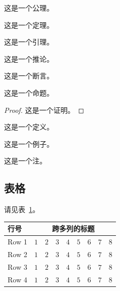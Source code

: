 \begin{axiom}
   这是一个公理。 
\end{axiom}
\begin{theorem}
   这是一个定理。 
\end{theorem}
\begin{lemma}
   这是一个引理。 
\end{lemma}
\begin{corollary}
   这是一个推论。 
\end{corollary}
\begin{assertion}
   这是一个断言。 
\end{assertion}
\begin{proposition}
   这是一个命题。 
\end{proposition}
\begin{proof}
    这是一个证明。
\end{proof}
\begin{definition}
    这是一个定义。
\end{definition}
\begin{example}
    这是一个例子。
\end{example}
\begin{remark}
    这是一个注。
\end{remark}



\subsection{表格}

请见表~\ref{tab:sample}。
\begin{table}[!htbp]
    \label{tab:sample}
    \centering
    \footnotesize%
    \setlength{\tabcolsep}{4pt}%
    \renewcommand{\arraystretch}{1.2}%
    \begin{tabular}{lcccccccc}
        \hline
        行号 & \multicolumn{8}{c}{跨多列的标题}\\
        \hline
        Row 1 & $1$ & $2$ & $3$ & $4$ & $5$ & $6$ & $7$ & $8$\\
        Row 2 & $1$ & $2$ & $3$ & $4$ & $5$ & $6$ & $7$ & $8$\\
        Row 3 & $1$ & $2$ & $3$ & $4$ & $5$ & $6$ & $7$ & $8$\\
        Row 4 & $1$ & $2$ & $3$ & $4$ & $5$ & $6$ & $7$ & $8$\\
        \hline
    \end{tabular}
\end{table}


